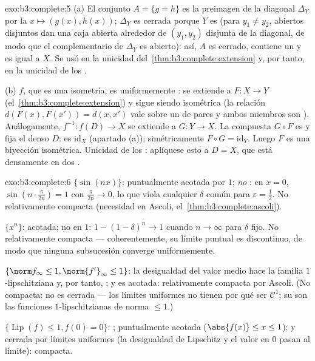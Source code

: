 \begin{solution}{exo:b3:complete:5}
(a) El conjunto $A = \{g = h\}$ es la preimagen de la diagonal
$\Delta_Y$ por la  $x \mapsto (g(x), h(x))$;
$\Delta_Y$ es cerrada porque $Y$ es
 (para $y_1 \neq y_2$,
 abiertos disjuntos dan una
caja abierta alrededor de $(y_1,
y_2)$ disjunta de la diagonal, de modo que el complementario de
$\Delta_Y$ es abierto): así, $A$ es cerrado, contiene un
 y es igual a $X$. Se
usó en la unicidad del~\cref{thm:b3:complete:extension} y, por tanto, en
la unicidad de los .

(b) $f$, que es una isometría, es uniformemente
: se extiende a
$F\colon X \to Y$ (el~\cref{thm:b3:complete:extension}) y sigue siendo
isométrica (la relación $d(F(x), F(x')) = d(x, x')$ vale sobre un
 de pares y ambos
miembros son ).
Análogamente, $f^{-1}\colon f(D) \to X$ se extiende a
$G \colon Y \to X$. La compuesta $G \circ F$ es
 y fija el denso $D$: es
$\mathrm{id}_X$ (apartado (a)); simétricamente $F \circ G =
\mathrm{id}_Y$. Luego $F$ es una biyección isométrica. Unicidad de los
: aplíquese esto a
$D = X$, que está densamente en dos
.
\end{solution}

\begin{solution}{exo:b3:complete:6}
$\{\sin(nx)\}$: puntualmente acotada por $1$; \emph{no}
: en $x = 0$,
$\sin(n\cdot\frac{\pi}{2n}) = 1$ con $\frac\pi{2n} \to 0$, lo que viola
cualquier $\delta$ común para $\varepsilon = \frac12$. No relativamente
compacta (necesidad en Ascoli,
el~\cref{thm:b3:complete:ascoli}).

$\{x^n\}$: acotada; no
 en $1$: $1 - (1 -
\delta)^n \to 1$ cuando $n \to \infty$ para $\delta$ fijo. No
relativamente compacta ---
coherentemente, su límite puntual es discontinuo, de modo que ninguna
subsucesión converge uniformemente.

$\{\norm f_\infty \leq 1, \norm{f'}_\infty \leq 1\}$: la desigualdad del
valor medio hace la familia $1$-lipschitziana y, por tanto,
; y es acotada:
relativamente compacta por Ascoli. (No
compacta: no es cerrada --- los
límites uniformes no tienen por qué ser $\mathcal C^1$; su
 son las funciones
$1$-lipschitzianas de norma $\leq 1$.)

$\{\operatorname{Lip}(f) \leq 1, f(0) = 0\}$:
; puntualmente
acotada ($\abs{f(x)} \leq x \leq 1$); y cerrada por límites uniformes
(la desigualdad de Lipschitz y el valor en $0$ pasan al límite):
compacta.
\end{solution}

